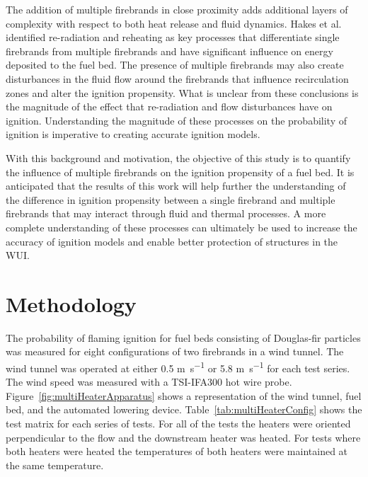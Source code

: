     The addition of multiple firebrands in close proximity adds additional layers of complexity with respect to both heat release and fluid dynamics.  Hakes et al.~\cite{Hakes2019a} identified re-radiation and reheating as key processes that differentiate single firebrands from multiple firebrands and have significant influence on energy deposited to the fuel bed.  The presence of multiple firebrands may also create disturbances in the fluid flow around the firebrands that influence recirculation zones and alter the ignition propensity. What is unclear from these conclusions is the magnitude of the effect that re-radiation and flow disturbances have on ignition. Understanding the magnitude of these processes on the probability of ignition is imperative to creating accurate ignition models. 
    
    With this background and motivation, the objective of this study is to quantify the influence of multiple firebrands on the ignition propensity of a fuel bed. It is anticipated that the results of this work will help further the understanding of the difference in ignition propensity between a single firebrand and multiple firebrands that may interact through fluid and thermal processes. A more complete understanding of these processes can ultimately be used to increase the accuracy of ignition models and enable better protection of structures in the WUI.
    
    
\section{Methodology}
    The probability of flaming ignition for fuel beds consisting of Douglas-fir particles was measured for eight configurations of two firebrands in a wind tunnel. The wind tunnel was operated at either 0.5 \si{\meter\per\second} or 5.8 \si{\meter\per\second} for each test series. The wind speed was measured with a TSI-IFA300 hot wire probe. Figure~\ref{fig:multiHeaterApparatus} shows a representation of the wind tunnel, fuel bed, and the automated lowering device. Table~\ref{tab:multiHeaterConfig} shows the test matrix for each series of tests. For all of the tests the heaters were oriented perpendicular to the flow and the downstream heater was heated. For tests where both heaters were heated the temperatures of both heaters were maintained at the same temperature. 
    
